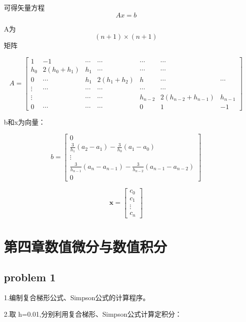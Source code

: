 \documentclass[UTF8]{ctexart}
\begin{document}
可得矢量方程$$ Ax=b$$


A为$$ (n+1)\times (n+1)$$矩阵


$$
A=\left[\begin{array}{lllllll}
{1} & {-1} & {\cdots} & {\cdots} & {\cdots} & {\cdots} \\ 
{h_{0}} & {2\left(h_{0}+h_{1}\right)} & {h_{1}} & {\cdots} & {\cdots} & {\cdots} \\ 
{0} & {\cdots} & {h_{1} } & {2\left(h_{1}+h_{2}\right)} & {h} & {\cdots} & {\cdots} \\ 
{\vdots} & {\cdots} & {\cdots} & {\cdots} & {\cdots} & {\cdots} \\ 
{\vdots} & {} & {\cdots} & {\cdots} & {h_{n-2}} & { 2(h_{n-2}+h_{n-1})} & {h_{n-1}} \\ 
{0} & {\cdots} & {\cdots} & {\cdots}  & {0} & {1} & {-1}
\end{array}\right]
$$

b和x为向量：


$$
b=\left[\begin{array}{c}{ 0} \\ {\frac{3}{h_{1}}\left(a_{2}-a_{1}\right)-\frac{3}{h_{0}}\left(a_{1}-a_{0}\right)} \\ {\vdots} \\ {\frac{3}{h_{n-1}}\left(a_{n}-a_{n-1}\right)-\frac{3}{h_{n-2}}\left(a_{n-1}-a_{n-2}\right)} \\ {0}\end{array}\right]
$$


$$
\boldsymbol{x}=\left[\begin{array}{c}{c_{0}} \\ {c_{1}} \\ {\vdots} \\ {c_{n}}\end{array}\right]
$$


\newpage





\section{第四章数值微分与数值积分}
\subsection{problem 1}

1.编制复合梯形公式、Simpson公式的计算程序。

2.取 h=0.01,分别利用复合梯形、Simpson公式计算定积分：
\end{document}
